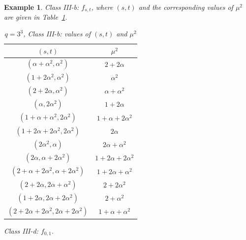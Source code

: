 \documentclass{amsart}
\newtheorem{exmp}[thm]{Example}
\numberwithin{equation}{section}
\theoremstyle{definition}
\newcommand{\A}{\alpha}
\begin{document}
\begin{exmp}
\medskip
Class III-b: $f_{s,t}$, where $(s,t)$ and the corresponding values of $\mu^2$ are given in Table~\ref{tb:3^3-case3b}.

\begin{table}[ht]
\caption{$q=3^3$, Class III-b: values of $(s,t)$ and $\mu^2$}\label{tb:3^3-case3b}
   \renewcommand*{\arraystretch}{1.4}
    \centering
     \begin{tabular}{c|c}
         \hline
         $(s,t)$ & $\mu^2$ \\ \hline
         $(\A+\A^2, \A^2)$ & $2+2\A$ \\
         $(1+2\A^2,\A^2)$ & $\A^2$ \\
         $(2+2\A,\A^2)$& $\A+\A^2$ \\
         $(\A,2\A^2)$& $1+2\A$ \\
         $(1+\A+\A^2,2\A^2)$& $1+\A+2\A^2$ \\
         $(1+2\A+2\A^2,2\A^2)$& $2\A$ \\
         $(2\A^2,\A)$& $2\A+\A^2$ \\
         $(2\A,\A+2\A^2)$& $1+2\A+2\A^2$ \\
         $(2+\A+2\A^2,\A+2\A^2)$& $1+2\A+\A^2$ \\
         $(2+2\A,2\A+\A^2)$& $2+2\A^2$ \\
         $(1+2\A,2\A+2\A^2)$& $2+\A^2$ \\
         $(2+2\A+2\A^2,2\A+2\A^2)$& $1+\A+\A^2$ \\
         \hline
     \end{tabular}
\end{table}

\medskip
Class III-d: $f_{0,1}$.
\end{exmp}
\end{document}
